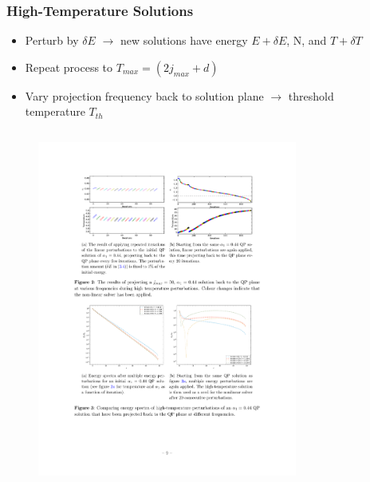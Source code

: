 \documentclass[mathserif,10pt]{beamer}
\newcommand{\bi}{\begin{itemize}}
\newcommand{\ei}{\end{itemize}}
\newcommand{\its}{\item}
\newcommand{\jm}{j_{max}}
\begin{document}
\frame
{
  \frametitle{High-Temperature Solutions}
  \bi
  \its Perturb by $\delta E$ $\to$ new solutions have energy $E + \delta E$, N, and $T + \delta T$
  \its Repeat process to $T_{max} = (2\jm + d)$
  \its Vary projection frequency back to solution plane $\to$ threshold \\ temperature $T_{th}$
  \ei
  
  \vspace{-0.15in}
  \begin{columns}
  \begin{figure}
  \centering
  \hspace{0.1in}
  \includegraphics[scale=0.75]{reop5}
  \end{figure}
  \begin{figure}
  \centering
  \hspace{-0.1in}

\end{figure}
\end{columns}}
\end{document}
